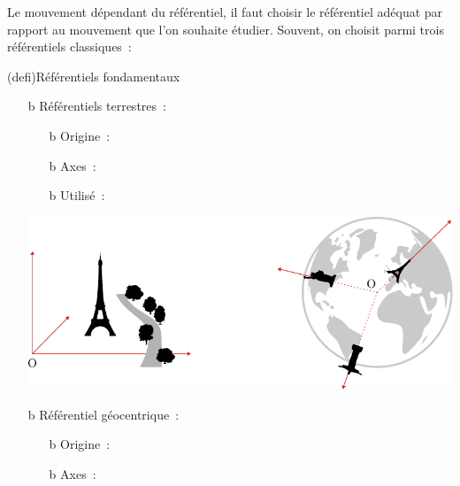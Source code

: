 \documentclass[../../main/main.tex]{subfiles}
\begin{document}
Le mouvement dépendant du référentiel, il faut choisir le référentiel adéquat
par rapport au mouvement que l'on souhaite étudier. Souvent, on choisit parmi
trois référentiels classiques~:
\begin{tcb*}[breakable](defi){Référentiels fondamentaux}
	\begin{itemize}
		\item[b]{Référentiels terrestres}~:
		      \begin{itemize}
			      \item[b]{Origine}~: 
			      \item[b]{Axes}~: 
			      \item[b]{Utilisé}~: 
		      \end{itemize}
		      \begin{center}
		      \end{center}
		      \begin{center}
			      \includegraphics[width=.6\linewidth]{ref_ter}
		      \end{center}
		\item[b]{Référentiel géocentrique}~:
		      \begin{itemize}
			      \item[b]{Origine}~: 
			      \item[b]{Axes}~: 

\end{itemize}
\end{itemize}
\end{tcb*}
\end{document}
